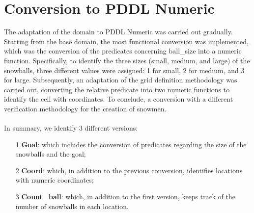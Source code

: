 \documentclass{article}
\begin{document}
\section*{Conversion to PDDL Numeric}
The adaptation of the domain to PDDL Numeric was carried out gradually. Starting from the base domain, the most functional conversion was implemented, which was the conversion 
of the predicates concerning ball\_size into 
a numeric function. Specifically, to identify the three sizes (small, medium, and large) of the snowballs, three different values were 
assigned: 1 for small, 2 for medium, and 3 for large.
Subsequently, an adaptation of the grid definition methodology was carried out,
converting the relative predicate into two numeric functions to identify the cell with coordinates.
To conclude, a conversion with a different verification methodology for the creation of snowmen.\\ \\
In summary, we identify 3 different versions:\vspace{-0.15cm}
\begin{itemize}
    \item[1] \textbf{Goal}: which includes the conversion of predicates regarding the size of the snowballs and the goal;\vspace{-0.15cm}
    \item[2] \textbf{Coord}: which, in addition to the previous conversion, identifies locations with numeric coordinates;\vspace{-0.15cm}
    \item[3] \textbf{Count\_ball}: which, in addition to the first version, keeps track of the number of snowballs in each location.\vspace{-0.15cm}
\end{itemize}
\phantom{a}\\
\phantom{a}
\end{document}
